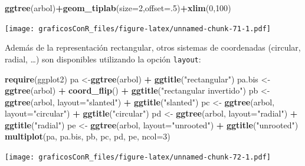 \documentclass[]{article}
\newenvironment{Shaded}{\begin{snugshade}}{\end{snugshade}}
\newcommand{\DataTypeTok}[1]{\textcolor[rgb]{0.13,0.29,0.53}{#1}}
\newcommand{\DecValTok}[1]{\textcolor[rgb]{0.00,0.00,0.81}{#1}}
\newcommand{\KeywordTok}[1]{\textcolor[rgb]{0.13,0.29,0.53}{\textbf{#1}}}
\newcommand{\NormalTok}[1]{#1}
\newcommand{\OperatorTok}[1]{\textcolor[rgb]{0.81,0.36,0.00}{\textbf{#1}}}
\newcommand{\StringTok}[1]{\textcolor[rgb]{0.31,0.60,0.02}{#1}}
\numberwithin{ejcnt}{section}
\begin{document}
\begin{Shaded}
\begin{Highlighting}[]
\KeywordTok{ggtree}\NormalTok{(arbol)}\OperatorTok{+}\KeywordTok{geom_tiplab}\NormalTok{(}\DataTypeTok{size=}\DecValTok{2}\NormalTok{,}\DataTypeTok{offset=}\NormalTok{.}\DecValTok{5}\NormalTok{)}\OperatorTok{+}\KeywordTok{xlim}\NormalTok{(}\DecValTok{0}\NormalTok{,}\DecValTok{100}\NormalTok{)}
\end{Highlighting}
\end{Shaded}

\texttt{[image: graficosConR\_files/figure-latex/unnamed-chunk-71-1.pdf]}

Además de la representación rectangular, otros sistemas de coordenadas (circular, radial, \ldots) son disponibles utilizando la opción \texttt{layout}:

\begin{Shaded}
\begin{Highlighting}[]
\KeywordTok{require}\NormalTok{(ggplot2)}
\NormalTok{pa <-}\KeywordTok{ggtree}\NormalTok{(arbol) }\OperatorTok{+}\StringTok{ }\KeywordTok{ggtitle}\NormalTok{(}\StringTok{"rectangular"}\NormalTok{)}
\NormalTok{pa.bis <-}\StringTok{ }\KeywordTok{ggtree}\NormalTok{(arbol) }\OperatorTok{+}\StringTok{ }\KeywordTok{coord_flip}\NormalTok{() }\OperatorTok{+}\StringTok{ }\KeywordTok{ggtitle}\NormalTok{(}\StringTok{"rectangular invertido"}\NormalTok{)}
\NormalTok{pb <-}\StringTok{ }\KeywordTok{ggtree}\NormalTok{(arbol, }\DataTypeTok{layout=}\StringTok{"slanted"}\NormalTok{) }\OperatorTok{+}\StringTok{ }\KeywordTok{ggtitle}\NormalTok{(}\StringTok{"slanted"}\NormalTok{)}
\NormalTok{pc <-}\StringTok{ }\KeywordTok{ggtree}\NormalTok{(arbol, }\DataTypeTok{layout=}\StringTok{"circular"}\NormalTok{) }\OperatorTok{+}\StringTok{ }\KeywordTok{ggtitle}\NormalTok{(}\StringTok{"circular"}\NormalTok{)}
\NormalTok{pd <-}\StringTok{ }\KeywordTok{ggtree}\NormalTok{(arbol, }\DataTypeTok{layout=}\StringTok{"radial"}\NormalTok{) }\OperatorTok{+}\StringTok{ }\KeywordTok{ggtitle}\NormalTok{(}\StringTok{"radial"}\NormalTok{)}
\NormalTok{pe <-}\StringTok{ }\KeywordTok{ggtree}\NormalTok{(arbol, }\DataTypeTok{layout=}\StringTok{"unrooted"}\NormalTok{) }\OperatorTok{+}\StringTok{ }\KeywordTok{ggtitle}\NormalTok{(}\StringTok{"unrooted"}\NormalTok{)}
\KeywordTok{multiplot}\NormalTok{(pa, pa.bis, pb, pc, pd, pe, }\DataTypeTok{ncol=}\DecValTok{3}\NormalTok{)}
\end{Highlighting}
\end{Shaded}

\texttt{[image: graficosConR\_files/figure-latex/unnamed-chunk-72-1.pdf]}
\end{document}
